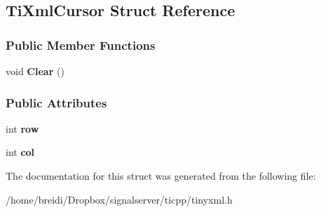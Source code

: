 \hypertarget{struct_ti_xml_cursor}{
\subsection{TiXmlCursor Struct Reference}
\label{struct_ti_xml_cursor}
}
\subsubsection*{Public Member Functions}
\begin{DoxyCompactItemize}
\item 
\hypertarget{struct_ti_xml_cursor_a1e6fa622b59dafb71b6efe595105dcdd}{
void {\bfseries Clear} ()}
\label{struct_ti_xml_cursor_a1e6fa622b59dafb71b6efe595105dcdd}

\end{DoxyCompactItemize}
\subsubsection*{Public Attributes}
\begin{DoxyCompactItemize}
\item 
\hypertarget{struct_ti_xml_cursor_a5b54dd949820c2db061e2be41f3effb3}{
int {\bfseries row}}
\label{struct_ti_xml_cursor_a5b54dd949820c2db061e2be41f3effb3}

\item 
\hypertarget{struct_ti_xml_cursor_a5694d7ed2c4d20109d350c14c417969d}{
int {\bfseries col}}
\label{struct_ti_xml_cursor_a5694d7ed2c4d20109d350c14c417969d}

\end{DoxyCompactItemize}


The documentation for this struct was generated from the following file:\begin{DoxyCompactItemize}
\item 
/home/breidi/Dropbox/signalserver/ticpp/tinyxml.h\end{DoxyCompactItemize}
